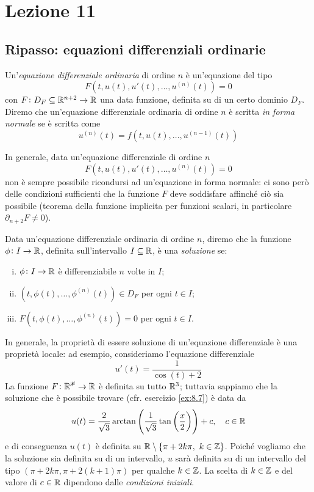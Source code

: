 \section{Lezione 11}
\subsection{Ripasso: equazioni differenziali ordinarie}
\begin{definition}
    \label{def:11.1}
    Un'\emph{equazione differenziale ordinaria} di ordine $n$ è un'equazione del tipo
    \[
    F(t, u(t), u'(t), \dots, u^{(n)}(t)) = 0
    \]
    con $F\colon D_F\subseteq \amsbb{R}^{n+2}\to \amsbb{R}$ una data funzione, definita su di un certo dominio $D_F$.\\
    Diremo che un'equazione differenziale ordinaria di ordine $n$ è scritta \emph{in forma normale} se è scritta come
    \[
    u^{(n)}(t) = f(t, u(t), \dots, u^{(n-1)}(t))
    \]
\end{definition}
\begin{remark}
    In generale, data un'equazione differenziale di ordine $n$
    \[
    F(t, u(t), u'(t), \dots, u^{(n)}(t))=0
    \]
    non è sempre possibile ricondursi ad un'equazione in forma normale: ci sono però delle condizioni sufficienti che la funzione $F$ deve soddisfare affinché ciò sia possibile (teorema della funzione implicita per funzioni scalari, in particolare $\partial_{n+2}F \ne 0$).
\end{remark}
\begin{definition}
    \label{def:11.2}
    Data un'equazione differenziale ordinaria di ordine $n$, diremo che la funzione $\phi\colon I \to \amsbb{R}$, definita sull'intervallo $I\subseteq \amsbb{R}$, è una \emph{soluzione} se:
    \begin{enumerate}[(i)]
        \item $\phi\colon I \to \amsbb{R}$ è differenziabile $n$ volte in $I$;
        \item $(t, \phi(t), \dots, \phi^{(n)}(t))\in D_F$ per ogni $t\in I$;
        \item $F(t, \phi(t), \dots, \phi^{(n)}(t))=0$ per ogni $t\in I$.
    \end{enumerate}
\end{definition}
\begin{remark}
    In generale, la proprietà di essere soluzione di un'equazione differenziale è una proprietà locale: ad esempio, consideriamo l'equazione differenziale
    \[
    u'(t) = \frac{1}{\cos(t)+2}
    \]
    La funzione $F\colon \amsbb{R^3}\to \amsbb{R}$ è definita su tutto $\amsbb{R}^3$; tuttavia sappiamo che la soluzione che è possibile trovare (cfr. esercizio \ref{ex:8.7}) è data da
    \[
    u(t) = \frac{2}{\sqrt{3}}\arctan\left(\frac{1}{\sqrt{3}}\tan\left(\frac{x}{2}\right)\right)+c, \quad c\in\amsbb{R}
    \]
    e di conseguenza $u(t)$ è definita su $\amsbb{R}\setminus\{\pi + 2k\pi, \ k\in\amsbb{Z}\}$. Poiché vogliamo che la soluzione sia definita su di un intervallo, $u$ sarà definita su di un intervallo del tipo $(\pi + 2k\pi, \pi + 2(k+1)\pi)$ per qualche $k\in\amsbb{Z}$. La scelta di $k\in\amsbb{Z}$ e del valore di $c\in\amsbb{R}$ dipendono dalle \emph{condizioni iniziali}.
\end{remark}
